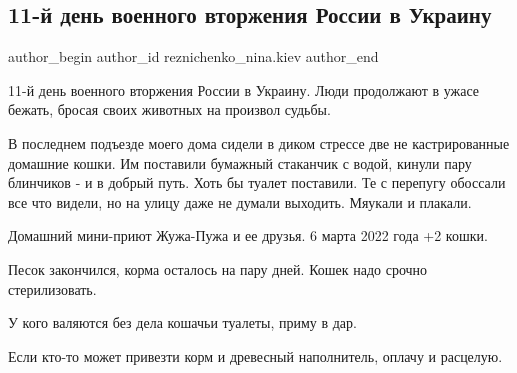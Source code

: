  
 
 
 
 
 
\subsection{11-й день военного вторжения России в Украину}
\label{sec:06_03_2022.fb.reznichenko_nina.kiev.1.day_11}
 
\ifcmt
 author_begin
   author_id reznichenko_nina.kiev
 author_end
\fi

11-й день военного вторжения России в Украину. Люди продолжают в ужасе бежать,
бросая своих животных на произвол судьбы. 


В последнем подъезде моего дома сидели в диком стрессе две не кастрированные
домашние кошки. Им поставили бумажный стаканчик с водой, кинули пару блинчиков
- и в добрый путь. Хоть бы туалет поставили. Те с перепугу обоссали все что
видели, но на улицу даже не думали выходить. Мяукали и плакали.

Домашний мини-приют Жужа-Пужа и ее друзья. 6 марта 2022 года +2 кошки. 

Песок закончился, корма осталось на пару дней. Кошек надо срочно стерилизовать. 

У кого валяются без дела кошачьи туалеты, приму в дар.

Если кто-то может привезти корм и древесный наполнитель, оплачу и расцелую.
